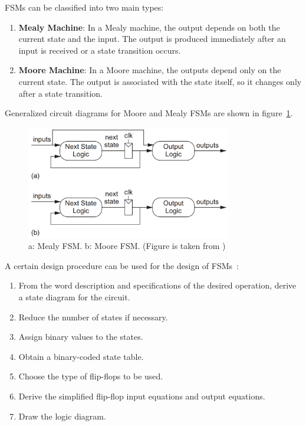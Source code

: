 \noindent
FSMs can be classified into two main types:

\begin{enumerate}
    \item \textbf{Mealy Machine}: In a Mealy machine, the output depends on both the current state and the input. The output is produced immediately after an input is received or a state transition occurs. 
    
    \item \textbf{Moore Machine}: In a Moore machine, the outputs depend only on the current state. The output is associated with the state itself, so it changes only after a state transition.
\end{enumerate}

\noindent
Generalized circuit diagrams for Moore and Mealy FSMs are shown in figure~\ref{fig:general_fsm}.

\begin{figure}[H]
    \centering
    \includegraphics[width=0.8\textwidth]{Figures/general fsm diagrams.png}
    \caption{a: Mealy FSM. b: Moore FSM. (Figure is taken from \cite[p.735]{CMOS_VLSI_design})}
    \label{fig:general_fsm}
\end{figure}


\noindent
A certain design procedure can be used for the design of FSMs~\cite{digital_design}:

\begin{enumerate}
  \item From the word description and specifications of the desired operation, derive a state diagram for the circuit.
  \item Reduce the number of states if necessary.
  \item Assign binary values to the states.
  \item Obtain a binary-coded state table.
  \item Choose the type of flip-flops to be used.
  \item Derive the simplified flip-flop input equations and output equations.
  \item Draw the logic diagram.
\end{enumerate}


